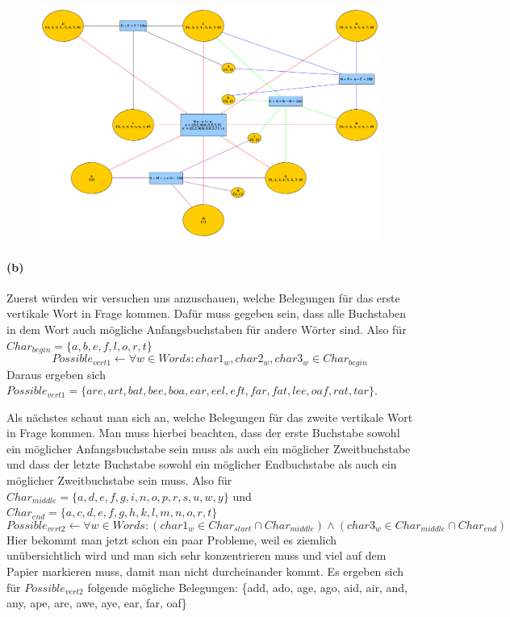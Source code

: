 \documentclass[]{article}
\begin{document}
\begin{figure}[ht]
  \centering
  \includegraphics[width=\textwidth]{./constraint_network.png}
\end{figure}

\pagebreak

\paragraph{(b)}\label{b}

Zuerst würden wir versuchen uns anzuschauen, welche Belegungen für das erste vertikale Wort in Frage kommen. Dafür muss gegeben sein, dass alle Buchstaben in dem Wort auch mögliche Anfangsbuchstaben für andere Wörter sind. Also  für $Char_{begin} = \{a,b,e,f,l,o,r,t\}$
\[ Possible_{vert1}  \leftarrow \forall w\in Words : char1_w, char2_w, char3_w \in Char_{begin} \]
Daraus ergeben sich $Possible_{vert1} = \{are, art, bat, bee, boa, ear, eel, eft, far, fat, lee, oaf, rat, tar\}$. 

Als nächstes schaut man sich an, welche Belegungen für das zweite vertikale Wort in Frage kommen. Man muss hierbei beachten, dass der erste Buchstabe sowohl ein möglicher Anfangsbuchstabe sein muss als auch ein möglicher Zweitbuchstabe und dass der letzte Buchstabe sowohl ein möglicher Endbuchstabe als auch ein möglicher Zweitbuchstabe sein muss.\newline
Also für $Char_{middle} = \{a,d,e,f,g,i,n,o,p,r,s,u,w,y\}$ und $Char_{end} = \{a,c,d,e,f,g,h,k,l,m,n,o,r,t\}$
\[ Possible_{vert2} \leftarrow \forall w \in Words : (char1_w \in Char_{start} \cap Char_{middle}) \wedge (char3_w \in Char_{middle} \cap Char_{end}) \]
Hier bekommt man jetzt schon ein paar Probleme, weil es ziemlich unübersichtlich wird und man sich sehr konzentrieren muss und viel auf dem Papier markieren muss, damit man nicht durcheinander kommt.
Es ergeben sich für $Possible_{vert2}$ folgende mögliche Belegungen:\newline
\{add, ado, age, ago, aid, air, and, any, ape, are, awe, aye, ear, far, oaf\}
\end{document}
